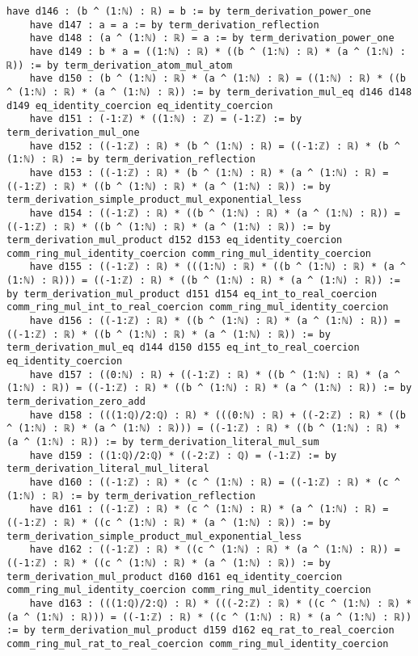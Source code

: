 \documentclass{article}
\begin{document}
\begin{tcolorbox}[colback=white!10, width=\linewidth]
\begin{lstlisting}[language=Lean4]
    have d146 : (b ^ (1:ℕ) : ℝ) = b := by term_derivation_power_one
    have d147 : a = a := by term_derivation_reflection
    have d148 : (a ^ (1:ℕ) : ℝ) = a := by term_derivation_power_one
    have d149 : b * a = ((1:ℕ) : ℝ) * ((b ^ (1:ℕ) : ℝ) * (a ^ (1:ℕ) : ℝ)) := by term_derivation_atom_mul_atom
    have d150 : (b ^ (1:ℕ) : ℝ) * (a ^ (1:ℕ) : ℝ) = ((1:ℕ) : ℝ) * ((b ^ (1:ℕ) : ℝ) * (a ^ (1:ℕ) : ℝ)) := by term_derivation_mul_eq d146 d148 d149 eq_identity_coercion eq_identity_coercion
    have d151 : (-1:ℤ) * ((1:ℕ) : ℤ) = (-1:ℤ) := by term_derivation_mul_one
    have d152 : ((-1:ℤ) : ℝ) * (b ^ (1:ℕ) : ℝ) = ((-1:ℤ) : ℝ) * (b ^ (1:ℕ) : ℝ) := by term_derivation_reflection
    have d153 : ((-1:ℤ) : ℝ) * (b ^ (1:ℕ) : ℝ) * (a ^ (1:ℕ) : ℝ) = ((-1:ℤ) : ℝ) * ((b ^ (1:ℕ) : ℝ) * (a ^ (1:ℕ) : ℝ)) := by term_derivation_simple_product_mul_exponential_less
    have d154 : ((-1:ℤ) : ℝ) * ((b ^ (1:ℕ) : ℝ) * (a ^ (1:ℕ) : ℝ)) = ((-1:ℤ) : ℝ) * ((b ^ (1:ℕ) : ℝ) * (a ^ (1:ℕ) : ℝ)) := by term_derivation_mul_product d152 d153 eq_identity_coercion comm_ring_mul_identity_coercion comm_ring_mul_identity_coercion
    have d155 : ((-1:ℤ) : ℝ) * (((1:ℕ) : ℝ) * ((b ^ (1:ℕ) : ℝ) * (a ^ (1:ℕ) : ℝ))) = ((-1:ℤ) : ℝ) * ((b ^ (1:ℕ) : ℝ) * (a ^ (1:ℕ) : ℝ)) := by term_derivation_mul_product d151 d154 eq_int_to_real_coercion comm_ring_mul_int_to_real_coercion comm_ring_mul_identity_coercion
    have d156 : ((-1:ℤ) : ℝ) * ((b ^ (1:ℕ) : ℝ) * (a ^ (1:ℕ) : ℝ)) = ((-1:ℤ) : ℝ) * ((b ^ (1:ℕ) : ℝ) * (a ^ (1:ℕ) : ℝ)) := by term_derivation_mul_eq d144 d150 d155 eq_int_to_real_coercion eq_identity_coercion
    have d157 : ((0:ℕ) : ℝ) + ((-1:ℤ) : ℝ) * ((b ^ (1:ℕ) : ℝ) * (a ^ (1:ℕ) : ℝ)) = ((-1:ℤ) : ℝ) * ((b ^ (1:ℕ) : ℝ) * (a ^ (1:ℕ) : ℝ)) := by term_derivation_zero_add
    have d158 : (((1:ℚ)/2:ℚ) : ℝ) * (((0:ℕ) : ℝ) + ((-2:ℤ) : ℝ) * ((b ^ (1:ℕ) : ℝ) * (a ^ (1:ℕ) : ℝ))) = ((-1:ℤ) : ℝ) * ((b ^ (1:ℕ) : ℝ) * (a ^ (1:ℕ) : ℝ)) := by term_derivation_literal_mul_sum
    have d159 : ((1:ℚ)/2:ℚ) * ((-2:ℤ) : ℚ) = (-1:ℤ) := by term_derivation_literal_mul_literal
    have d160 : ((-1:ℤ) : ℝ) * (c ^ (1:ℕ) : ℝ) = ((-1:ℤ) : ℝ) * (c ^ (1:ℕ) : ℝ) := by term_derivation_reflection
    have d161 : ((-1:ℤ) : ℝ) * (c ^ (1:ℕ) : ℝ) * (a ^ (1:ℕ) : ℝ) = ((-1:ℤ) : ℝ) * ((c ^ (1:ℕ) : ℝ) * (a ^ (1:ℕ) : ℝ)) := by term_derivation_simple_product_mul_exponential_less
    have d162 : ((-1:ℤ) : ℝ) * ((c ^ (1:ℕ) : ℝ) * (a ^ (1:ℕ) : ℝ)) = ((-1:ℤ) : ℝ) * ((c ^ (1:ℕ) : ℝ) * (a ^ (1:ℕ) : ℝ)) := by term_derivation_mul_product d160 d161 eq_identity_coercion comm_ring_mul_identity_coercion comm_ring_mul_identity_coercion
    have d163 : (((1:ℚ)/2:ℚ) : ℝ) * (((-2:ℤ) : ℝ) * ((c ^ (1:ℕ) : ℝ) * (a ^ (1:ℕ) : ℝ))) = ((-1:ℤ) : ℝ) * ((c ^ (1:ℕ) : ℝ) * (a ^ (1:ℕ) : ℝ)) := by term_derivation_mul_product d159 d162 eq_rat_to_real_coercion comm_ring_mul_rat_to_real_coercion comm_ring_mul_identity_coercion

\end{lstlisting}
\end{tcolorbox}
\end{document}
